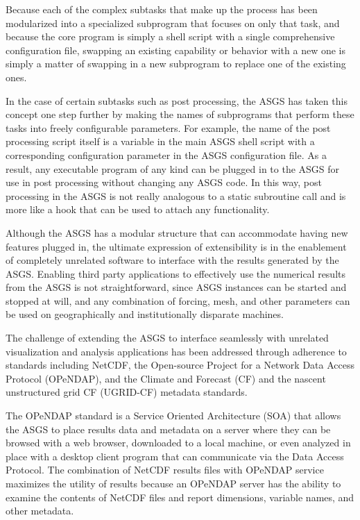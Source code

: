 \documentclass[jmse,article,submit,moreauthors,pdftex,12pt,a4paper]{mdpi}
\begin{document}
Because each of the complex subtasks that make up the process has 
been modularized into a specialized subprogram that focuses on only 
that task, and because the core program is simply a shell script 
with a single comprehensive configuration file, swapping an existing 
capability or behavior with a new one is simply a matter of swapping 
in a new subprogram to replace one of the existing ones.

In the case of certain subtasks such as post processing, the ASGS 
has taken this concept one step further by making the names of 
subprograms that perform these tasks into freely configurable 
parameters. For example, the name of the post processing script 
itself is a variable in the main ASGS shell script with a 
corresponding configuration parameter in the ASGS configuration 
file. As a result, any executable program of any kind can be plugged 
in to the ASGS for use in post processing without changing any ASGS 
code. In this way, post processing in the ASGS is not really 
analogous to a static subroutine call and is more like a hook that 
can be used to attach any functionality. 

Although the ASGS has a modular structure that can accommodate 
having new features plugged in, the ultimate expression of 
extensibility is in the enablement of completely unrelated software 
to interface with the results generated by the ASGS. Enabling third 
party applications to effectively use the numerical results from the 
ASGS is not straightforward, since ASGS instances can be started
and stopped at will, and any combination of forcing, mesh, and 
other parameters can be used on geographically and institutionally
disparate machines.

The challenge of extending the ASGS to interface seamlessly with 
unrelated visualization and analysis applications has been addressed 
through adherence to standards including NetCDF, the Open-source 
Project for a Network Data Access Protocol (OPeNDAP), and the 
Climate and Forecast (CF) and the nascent unstructured grid CF 
(UGRID-CF) metadata standards.

The OPeNDAP standard is a Service Oriented Architecture (SOA) that 
allows the ASGS to place results data and metadata on a server where 
they can be browsed with a web browser, downloaded to a local 
machine, or even analyzed in place with a desktop client program 
that can communicate via the Data Access Protocol. The combination
of NetCDF results files with OPeNDAP service maximizes the utility of
results because an OPeNDAP server has the ability to examine the
contents of NetCDF files and report dimensions, variable names,
and other metadata. 
\end{document}

